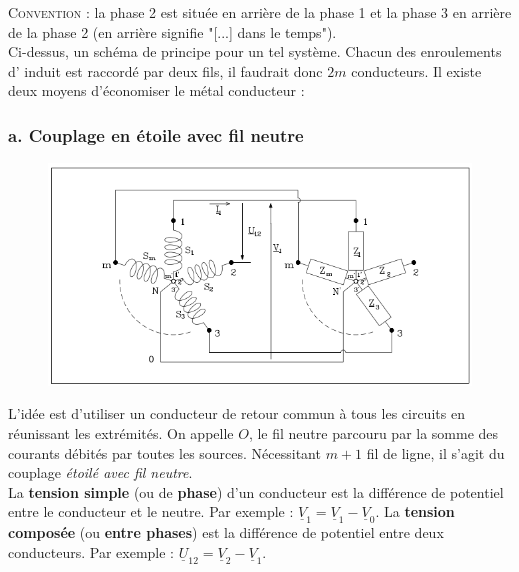 	\textsc{Convention :} la phase 2 est située en arrière de la phase 1 et la 
	phase 3 en arrière de la phase 2 (en arrière signifie "[...] dans le temps").\\
	
	Ci-dessus, un schéma de principe pour un tel système. Chacun des enroulements d'
	induit est raccordé par deux fils, il faudrait donc $2m$ conducteurs. Il existe 
	deux moyens d'économiser le métal conducteur :
	
		\subsubsection{a. Couplage en étoile avec fil neutre}
		\begin{figure}
		\vspace{-5mm}
		\includegraphics[scale=0.4]{ch1/image6.png}
		\end{figure}
		L'idée est d'utiliser un conducteur de retour commun à tous les circuits 
		en réunissant les extrémités. On appelle $O$, le fil neutre parcouru par 
		la somme des courants débités par toutes les sources. Nécessitant $m+1$ 
		fil de ligne, il s'agit du couplage \textit{étoilé avec fil neutre}.\\
		
		La \textbf{tension simple} (ou de \textbf{phase}) d'un conducteur est 
		la différence de potentiel entre le conducteur et le neutre. Par 
		exemple : $\underline{V}_1 = \underline{V}_1-\underline{V}_0$. La 
		\textbf{tension composée} (ou \textbf{entre phases}) est la différence 
		de potentiel entre deux conducteurs. Par exemple : $\underline{U}_{12} = 
		\underline{V}_2-\underline{V}_1$.
		
		
